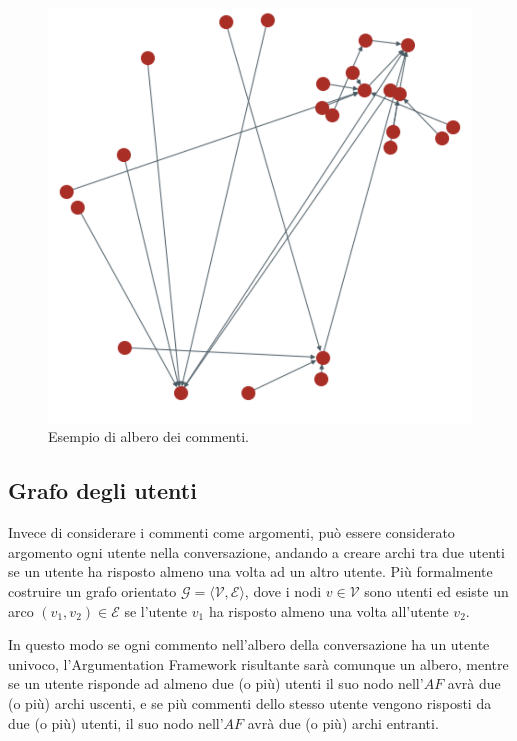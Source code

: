 \begin{figure}[h]
    \includegraphics[width=\linewidth]{Immagini/comments-tree.png}
    \caption{Esempio di albero dei commenti.}
    \label{fig:comments-tree}
\end{figure}

\subsection{Grafo degli utenti}
\label{subsection:grafo_utenti}
Invece di considerare i commenti come argomenti, può essere considerato argomento ogni utente nella conversazione, andando a creare archi tra due utenti se un utente ha risposto almeno una volta ad un altro utente. Più formalmente costruire un grafo orientato $\mathcal{G = ⟨V, E⟩}$, dove i nodi $v \in \mathcal{V}$ sono utenti ed esiste un arco $(v_1,v_2) \in \mathcal{E}$ se l'utente $v_1$ ha risposto almeno una volta all'utente $v_2$.

In questo modo se ogni commento nell'albero della conversazione ha un utente univoco, l'Argumentation Framework risultante sarà comunque un albero, mentre se un utente risponde ad almeno due (o più) utenti il suo nodo nell'$AF$ avrà due (o più) archi uscenti, e se più commenti dello stesso utente vengono risposti da due (o più) utenti, il suo nodo nell'$AF$ avrà due (o più) archi entranti.


